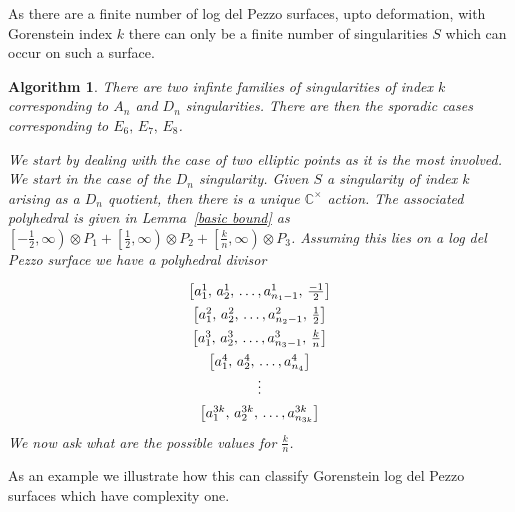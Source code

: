 \documentclass[11pt]{amsart}
\theoremstyle{plain}
\newtheorem{algorithm}[thm]{Algorithm}
\newcommand{\mb}[1]{\mathbb{#1}}
\begin{document}
As there are a finite number of log del Pezzo surfaces, upto deformation, with Gorenstein index $k$ there can only be a finite number of singularities $S$ which can occur on such a surface. 

\begin{algorithm}

There are two infinte families of singularities of index $k$ corresponding to $A_n$ and $D_n$ singularities. There are then the sporadic cases corresponding to $E_6, \, E_7, \, E_8$.

We start by dealing with the case of two elliptic points as it is the most involved. We start in the case of the $D_n$ singularity. Given $S$ a singularity of index $k$ arising as a $D_n$ quotient, then there is a unique $\mb{C}^\times$ action. The associated polyhedral is given in Lemma~\ref{basic bound} as $\left[-\frac{1}{2}, \infty \right) \otimes P_1 + \left[ \frac{1}{2}, \infty \right) \otimes P_2 + \left[ \frac{k}{n}, \infty \right) \otimes P_3$. Assuming this lies on a log del Pezzo surface we have a polyhedral divisor
\[\def\arraystretch{1.4}
\begin{array}{c}
\left[a_1^1, \, a_2^1,\,  \dots, a_{n_1 - 1}^1, \, \frac{-1}{2} \right] \\
\left[a_1^2, \, a_2^2,\,  \dots, a_{n_2 - 1}^2, \, \frac{1}{2} \right] \\
\left[a_1^3, \, a_2^3,\,  \dots, a_{n_3 - 1}^3, \, \frac{k}{n} \right] \\
\left[a_1^4, \, a_2^4,\,  \dots, a_{n_4}^4 \right] \\
\vdots \\
\left[ a_1^{3k}, \, a_2^{3k}, \,  \dots, a_{n_{3k}}^{3k} \right] \\
\end{array}
\]
We now ask what are the possible values for $\frac{k}{n}$.
\end{algorithm}


As an example we illustrate how this can classify Gorenstein log del Pezzo surfaces which have complexity one.
\end{document}
